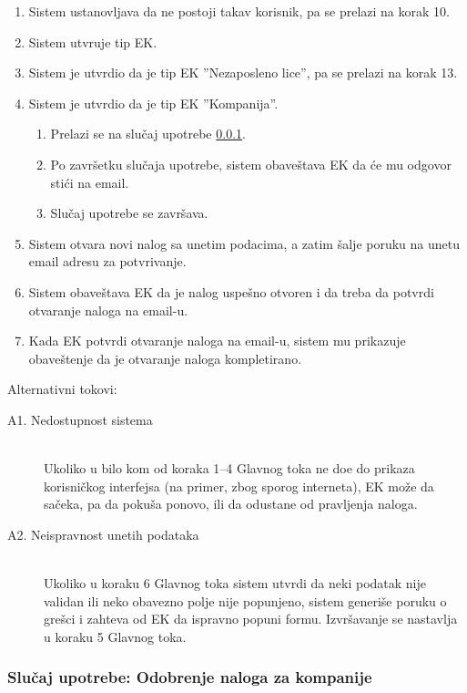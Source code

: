 \begin{enumerate}
\begin{enumerate}
	\end{enumerate}
	\item Sistem ustanovljava da ne postoji takav korisnik, pa se prelazi na korak 10.
	\item Sistem utvr\dj uje tip EK.
	\item Sistem je utvrdio da je tip EK ''Nezaposleno lice'', pa se prelazi na korak 13.
	\item Sistem je utvrdio da je tip EK ''Kompanija''.
	\begin{enumerate}
		\item Prelazi se na slu\v caj upotrebe \ref{su: odobrenje naloga za kompanije}.
		\item Po zavr\v setku slu\v caja upotrebe, sistem obave\v stava EK da \' ce mu odgovor sti\' ci na email.
		\item Slu\v caj upotrebe se zavr\v sava.
	\end{enumerate}
	\item Sistem otvara novi nalog sa unetim podacima, a zatim \v salje poruku na unetu email adresu za potvr\dj ivanje.
	\item Sistem obave\v stava EK da je nalog uspe\v sno otvoren i da treba da potvrdi otvaranje naloga na email-u.
	\item Kada EK potvrdi otvaranje naloga na email-u, sistem mu prikazuje obave\v stenje da je otvaranje naloga kompletirano.
\end{enumerate}

\noindent Alternativni tokovi: 
\begin{description}
	\item[A1. Nedostupnost sistema] ~\\
	Ukoliko u bilo kom od koraka 1--4 Glavnog toka ne do\dj e do prikaza korisni\v ckog interfejsa (na primer, zbog sporog interneta), EK mo\v ze da sa\v ceka, pa da poku\v sa ponovo, ili da odustane od pravljenja naloga.
	
	\item[A2. Neispravnost unetih podataka] ~\\
	Ukoliko u koraku 6 Glavnog toka sistem utvrdi da neki podatak nije validan ili neko obavezno polje nije popunjeno, sistem generi\v se poruku o gre\v sci i zahteva od EK da ispravno popuni formu. Izvr\v savanje se nastavlja u koraku 5 Glavnog toka.
\end{description}

\subsubsection{Slu\v caj upotrebe: Odobrenje naloga za kompanije}
\label{su: odobrenje naloga za kompanije}

